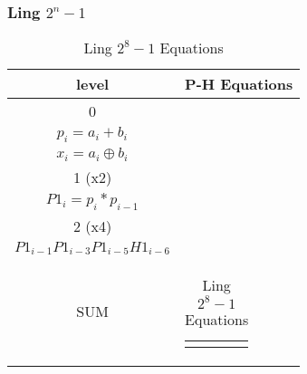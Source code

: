 \subsubsection{Ling $2^n-1$}

\begin{table}[H]
\centering
     \begin{tabularx}{\textwidth}{ || c | X || } 

        \hline
        level & P-H Equations\\
        \hline
        \hline
        
        0   & 
        \begin{tabular}{@{}c@{}}
        $g_i = a_i * b_i$\\
        $p_i = a_i + b_i$\\
        $x_i = a_i \oplus b_i $
        \end{tabular}\\\hline

        
        1 (x2)  & 
        \begin{tabular}{@{}c@{}}
        $H1_i = g_i + g_{i-1}$\\
        $P1_i = p_i * p_{i-1}$
        \end{tabular}\\\hline

        2 (x4)  & 
        \begin{tabular}{@{}c@{}}
        $H2_i = H1_i + P1_{i-1}H1_{i-2} + P1_{i-1}P1_{i-3}H1_{i-4} +$ \\ $P1_{i-1}P1_{i-3}P1_{i-5}H1_{i-6}$
        \end{tabular}\\\hline


        SUM   & 
        \begin{tabular}{@{}c@{}}
        $ sum_i = H2_{i-1}\ ?\ (x_i \oplus p_{i-1})\ :\ x_i$
        \end{tabular}\\\hline

    \end{tabularx}
\caption{Ling $2^{8}-1$ Equations}
\end{table}


